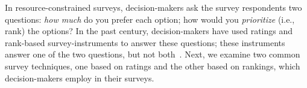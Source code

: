 In resource-constrained surveys, decision-makers ask the survey respondents two questions: \textit{how much} do you prefer each option; how would you \textit{prioritize} (i.e., rank) the options? In the past century, decision-makers have used ratings and rank-based survey-instruments to answer these questions; these instruments answer one of the two questions, but not both~\cite{moors2016two}.  Next, we examine two common survey techniques, one based on ratings and the other based on rankings, which decision-makers employ in their surveys.









